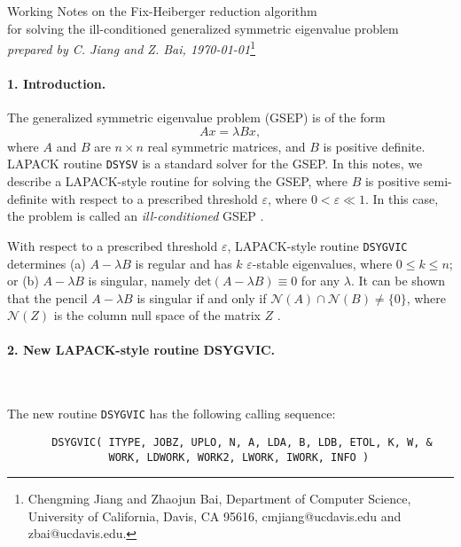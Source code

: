 \documentclass[11pt]{article}
\begin{document}
\begin{center} 
{\large 
Working Notes on the Fix-Heiberger reduction algorithm  \\
for solving the ill-conditioned generalized symmetric eigenvalue
problem} \\
{\em prepared by C. Jiang and Z. Bai, \today}\footnote{
Chengming Jiang and Zhaojun Bai, Department of Computer Science, 
University of California, Davis, CA 95616, cmjiang@ucdavis.edu and 
zbai@ucdavis.edu.}    
\end{center} 

\paragraph{1. Introduction.}  
The {generalized symmetric eigenvalue problem} (GSEP) is of
the form 
\begin{equation}\label{eq:gep}
Ax = \lambda B x, 
\end{equation}
where $A$ and $B$ are $n\times n$ real symmetric matrices, and
$B$ is positive definite. LAPACK routine {\tt DSYSV} is a 
standard solver for the GSEP. 
In this notes, we describe a LAPACK-style routine  for solving
the GSEP, where $B$ is positive semi-definite with respect to 
a prescribed threshold $\varepsilon$, where 
$0 < \varepsilon \ll 1$. In this case, the problem is called 
an {\em ill-conditioned} GSEP \cite{fix1972algorithm,jungen92}.

\bigskip

With respect to a prescribed threshold $\varepsilon$,
LAPACK-style routine {\tt DSYGVIC} determines 
(a) $A - \lambda B$ is regular and has $k$ $\varepsilon$-stable 
eigenvalues, where $ 0 \leq k \leq n$; or (b) 
$A - \lambda B$ is singular, namely 
$\mbox{det}(A-\lambda B) \equiv 0$ for any $\lambda$. 
It can be shown that the pencil $A-\lambda B$ is singular 
if and only if 
$\mathcal{N}(A)\cap \mathcal{N}(B) \neq \{0\}$, 
where $\mathcal{N}(Z)$ is the column null space of the matrix $Z$
\cite{cao1987deflation}. 

\paragraph{2. New LAPACK-style routine DSYGVIC.}   ~ 

The new routine {\tt DSYGVIC} has the following calling sequence: 
\begin{verbatim} 
       DSYGVIC( ITYPE, JOBZ, UPLO, N, A, LDA, B, LDB, ETOL, K, W, & 
                WORK, LDWORK, WORK2, LWORK, IWORK, INFO )
\end{verbatim} 
\end{document}

